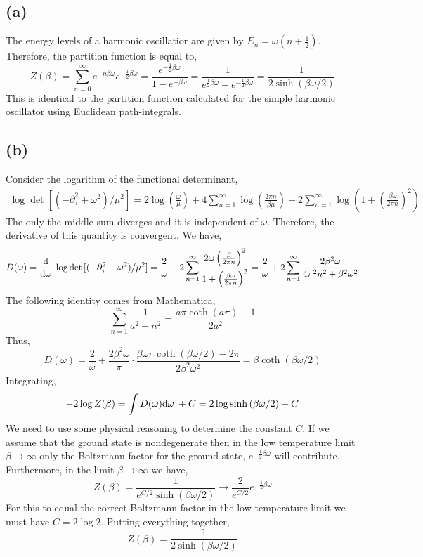\documentclass[12pt]{article}
\begin{document}
\subsection{(a)}

The energy levels of a harmonic oscillatior are given by $E_n = \omega \left(n + \tfrac{1}{2} \right)$. Therefore, the partition function is equal to,
\[ Z(\beta) = \sum_{n = 0}^\infty e^{-n \beta \omega} e^{-\frac{1}{2} \beta \omega} = \frac{e^{- \frac{1}{2} \beta \omega}}{1 - e^{-\beta \omega}} = \frac{1}{e^{\frac{1}{2} \beta \omega} - e^{-\frac{1}{2} \beta \omega}} = \frac{1}{2 \sinh{(\beta \omega / 2)}} \]
This is identical to the partition function calculated for the simple harmonic oscillator using Euclidean path-integrals. 

\subsection{(b)}

Consider the logarithm of the functional determinant,
\begin{align*}
\log{\det{[(-\partial_{\tau}^2 + \omega^2)/ \mu^2]}} = 2 \log{\left( \frac{\omega}{\mu} \right)} + 4 \sum_{n = 1}^\infty \log{\left( \frac{2 \pi n}{\beta \mu} \right)} + 2 \sum_{n = 1}^\infty \log{\left( 1 + \left( \frac{\beta \omega}{2 \pi n} \right)^2 \right) }
\end{align*}
The only the middle sum diverges and it is independent of $\omega$. Therefore, the derivative of this quantity is convergent.
We have,
\begin{align*}
D(\omega) = \frac{\mathrm{d} \:}{\mathrm{d}\omega \:} \log{\det{[(-\partial_{\tau}^2 + \omega^2)/ \mu^2]}} = \frac{2}{\omega} + 2 \sum_{n = 1}^\infty \frac{ 2 \omega \left( \frac{\beta}{2 \pi n} \right)^2 }{1 + \left( \frac{\beta \omega}{2 \pi n} \right)^2} = \frac{2}{\omega} + 2 \sum_{n = 1}^\infty \frac{ 2 \beta^2 \omega }{4 \pi^2 n^2 + \beta^2 \omega^2} 
\end{align*}
The following identity comes from Mathematica,
\[ \sum_{n = 1}^\infty \frac{1}{a^2 + n^2} = \frac{a \pi \coth{(a \pi)} - 1}{2 a^2} \]
Thus,
\[ D(\omega) = \frac{2}{\omega} + \frac{2 \beta^2 \omega}{\pi} \cdot \frac{\beta \omega \pi \coth{(\beta \omega / 2)} - 2 \pi}{2\beta^2 \omega^2} = \beta \coth{(\beta \omega / 2)} \]
Integrating,
\begin{align*}
-2 \log{Z(\beta)} = \int D(\omega) \mathrm{d}\omega \: + C = 2 \log{\sinh{(\beta \omega / 2)}} + C
\end{align*}
We need to use some physical reasoning to determine the constant $C$. If we assume that the ground state is nondegenerate then in the low temperature limit $\beta \to \infty$ only the Boltzmann factor for the ground state, $e^{-\frac{1}{2} \beta \omega}$ will contribute. Furthermore, in the limit $\beta \to \infty$ we have,
\[ Z(\beta) = \frac{1}{e^{C/2} \sinh{(\beta \omega / 2)}} \to \frac{2}{e^{C/2}} e^{-\frac{1}{2} \beta \omega } \]
For this to equal the correct Boltzmann factor in the low temperature limit we must have $C = 2 \log{2}$. Putting everything together,
\[ Z(\beta) = \frac{1}{2 \sinh{(\beta \omega / 2)}} \]
\end{document}
